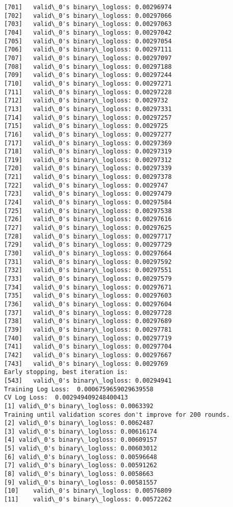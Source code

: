 \documentclass[11pt]{article}
\begin{document}
\begin{Verbatim}[commandchars=\\\{\}]
[701]	valid\_0's binary\_logloss: 0.00296974
[702]	valid\_0's binary\_logloss: 0.00297066
[703]	valid\_0's binary\_logloss: 0.00297063
[704]	valid\_0's binary\_logloss: 0.00297042
[705]	valid\_0's binary\_logloss: 0.00297054
[706]	valid\_0's binary\_logloss: 0.00297111
[707]	valid\_0's binary\_logloss: 0.00297097
[708]	valid\_0's binary\_logloss: 0.00297188
[709]	valid\_0's binary\_logloss: 0.00297244
[710]	valid\_0's binary\_logloss: 0.00297271
[711]	valid\_0's binary\_logloss: 0.00297228
[712]	valid\_0's binary\_logloss: 0.0029732
[713]	valid\_0's binary\_logloss: 0.00297331
[714]	valid\_0's binary\_logloss: 0.00297257
[715]	valid\_0's binary\_logloss: 0.0029725
[716]	valid\_0's binary\_logloss: 0.00297277
[717]	valid\_0's binary\_logloss: 0.00297369
[718]	valid\_0's binary\_logloss: 0.00297319
[719]	valid\_0's binary\_logloss: 0.00297312
[720]	valid\_0's binary\_logloss: 0.00297339
[721]	valid\_0's binary\_logloss: 0.00297378
[722]	valid\_0's binary\_logloss: 0.0029747
[723]	valid\_0's binary\_logloss: 0.00297479
[724]	valid\_0's binary\_logloss: 0.00297584
[725]	valid\_0's binary\_logloss: 0.00297538
[726]	valid\_0's binary\_logloss: 0.00297616
[727]	valid\_0's binary\_logloss: 0.00297625
[728]	valid\_0's binary\_logloss: 0.00297717
[729]	valid\_0's binary\_logloss: 0.00297729
[730]	valid\_0's binary\_logloss: 0.00297664
[731]	valid\_0's binary\_logloss: 0.00297592
[732]	valid\_0's binary\_logloss: 0.00297551
[733]	valid\_0's binary\_logloss: 0.00297579
[734]	valid\_0's binary\_logloss: 0.00297671
[735]	valid\_0's binary\_logloss: 0.00297603
[736]	valid\_0's binary\_logloss: 0.00297604
[737]	valid\_0's binary\_logloss: 0.00297728
[738]	valid\_0's binary\_logloss: 0.00297689
[739]	valid\_0's binary\_logloss: 0.00297781
[740]	valid\_0's binary\_logloss: 0.00297719
[741]	valid\_0's binary\_logloss: 0.00297704
[742]	valid\_0's binary\_logloss: 0.00297667
[743]	valid\_0's binary\_logloss: 0.0029769
Early stopping, best iteration is:
[543]	valid\_0's binary\_logloss: 0.00294941
Training Log Loss:  0.0006759659029639558
CV Log Loss:  0.002949409248400413
[1]	valid\_0's binary\_logloss: 0.0063392
Training until validation scores don't improve for 200 rounds.
[2]	valid\_0's binary\_logloss: 0.0062487
[3]	valid\_0's binary\_logloss: 0.00616174
[4]	valid\_0's binary\_logloss: 0.00609157
[5]	valid\_0's binary\_logloss: 0.00603012
[6]	valid\_0's binary\_logloss: 0.00596648
[7]	valid\_0's binary\_logloss: 0.00591262
[8]	valid\_0's binary\_logloss: 0.0058663
[9]	valid\_0's binary\_logloss: 0.00581557
[10]	valid\_0's binary\_logloss: 0.00576809
[11]	valid\_0's binary\_logloss: 0.00572262

\end{Verbatim}
\end{document}
